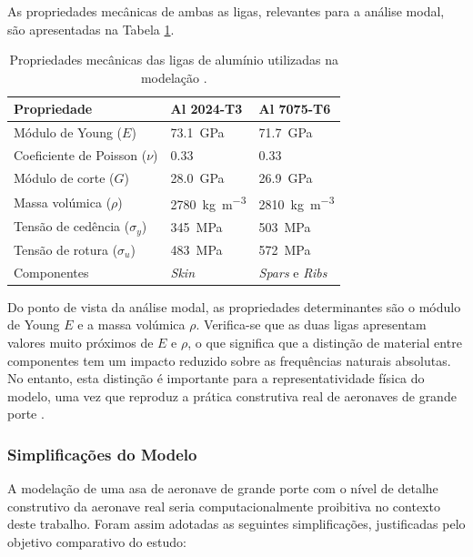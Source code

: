 \documentclass[a4paper,fleqn]{cas-sc}
\begin{document}
As propriedades mecânicas de ambas as ligas, relevantes para a análise modal, são apresentadas na Tabela \ref{tab:materiais}.

\begin{table}
\centering
\caption{Propriedades mecânicas das ligas de alumínio utilizadas 
na modelação \cite{ASM2008}.}
\label{tab:materiais}
\renewcommand{\arraystretch}{1.4}
\begin{tabularx}{\textwidth}{p{4.5cm} X X}
\toprule
\textbf{Propriedade} & \textbf{Al 2024-T3} & \textbf{Al 7075-T6} \\
\midrule
Módulo de Young ($E$)           
    & \SI{73.1}{\giga\pascal}   
    & \SI{71.7}{\giga\pascal}   \\
Coeficiente de Poisson ($\nu$)  
    & $0.33$                    
    & $0.33$                    \\
Módulo de corte ($G$)           
    & \SI{28.0}{\giga\pascal}   
    & \SI{26.9}{\giga\pascal}   \\
Massa volúmica ($\rho$)         
    & \SI{2780}{\kilo\gram\per\cubic\meter}  
    & \SI{2810}{\kilo\gram\per\cubic\meter}  \\
Tensão de cedência ($\sigma_y$) 
    & \SI{345}{\mega\pascal}    
    & \SI{503}{\mega\pascal}    \\
Tensão de rotura ($\sigma_u$)   
    & \SI{483}{\mega\pascal}    
    & \SI{572}{\mega\pascal}    \\
Componentes                     
    & \textit{Skin}             
    & \textit{Spars} e \textit{Ribs} \\
\bottomrule
\end{tabularx}
\end{table}

Do ponto de vista da análise modal, as propriedades determinantes são o módulo de Young $E$ e a massa volúmica $\rho$. Verifica-se que as duas ligas apresentam valores muito próximos de $E$ e $\rho$, o que significa que a distinção de material entre componentes tem um impacto reduzido sobre as frequências naturais absolutas. No entanto, esta distinção é importante para a representatividade física do modelo, uma vez que reproduz a prática construtiva real de aeronaves de grande porte \cite{Megson2012}.

\subsubsection{Simplificações do Modelo}

A modelação de uma asa de aeronave de grande porte com o nível de detalhe construtivo da aeronave real seria computacionalmente proibitiva no contexto deste trabalho. Foram assim adotadas as seguintes simplificações, justificadas pelo objetivo comparativo do estudo:
\end{document}
